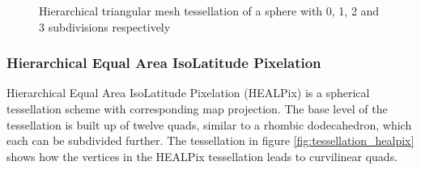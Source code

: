 \begin{figure}
\begin{subfigure}[b]{0.2\textwidth}
    \end{subfigure}
    \caption{Hierarchical triangular mesh tessellation of a sphere with 0, 1, 2 and 3 subdivisions respectively}
    \label{fig:tessellation_htm}
\end{figure}

\subsubsection{Hierarchical Equal Area IsoLatitude Pixelation}

Hierarchical Equal Area IsoLatitude Pixelation (HEALPix) is a spherical tessellation scheme with corresponding map projection. The base level of the tessellation is built up of twelve quads, similar to a rhombic dodecahedron, which each can be subdivided further. The tessellation in figure \ref{fig:tessellation_healpix} shows how the vertices in the HEALPix tessellation leads to curvilinear quads.

